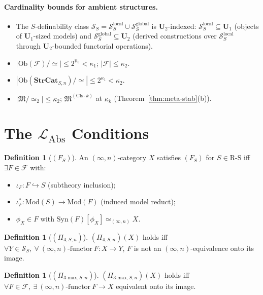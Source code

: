 \documentclass[11pt]{article}
\theoremstyle{plain}
\theoremstyle{definition}
\newtheorem{definition}[theorem]{Definition}
\newcommand{\RS}{\mathrm{R\text{-}S}}
\newcommand{\cS}{\mathcal{S}}
\newcommand{\cF}{\mathcal{F}}
\newcommand{\fM}{\mathfrak{M}}
\newcommand{\LAbs}{\mathcal{L}_{\mathrm{Abs}}}
\newcommand{\Ob}{\mathrm{Ob}}
\newcommand{\Syn}{\mathrm{Syn}}
\newcommand{\Mod}{\mathrm{Mod}}
\begin{document}
\paragraph{Cardinality bounds for ambient structures.}
\begin{itemize}
\item The $S$-definability class $\cS_S = \cS_S^{\mathrm{local}} \cup \cS_S^{\mathrm{global}}$ is $\mathbf{U}_2$-indexed: $\cS_S^{\mathrm{local}} \subseteq \mathbf{U}_1$ (objects of $\mathbf{U}_1$-sized models) and $\cS_S^{\mathrm{global}} \subseteq \mathbf{U}_2$ (derived constructions over $\cS_S^{\mathrm{local}}$ through $\mathbf{U}_2$-bounded functorial operations).
\item $|\Ob(\cF)/\!\simeq| \leq 2^{\aleph_0} < \kappa_1$; $|\cF| \leq \kappa_2$.
\item $|\Ob(\mathbf{StrCat}_{S, n})/\!\simeq| \leq 2^{\kappa_1} < \kappa_2$.
\item $|\fM / \!\simeq_2| \leq \kappa_2$; $\fM^{(\mathrm{Cls}\cdot k)}$ at $\kappa_k$ (Theorem~\ref{thm:meta-stab}(b)).
\end{itemize}

\section{\texorpdfstring{The $\LAbs$ Conditions}{The L\_Abs Conditions}}\label{sec:conditions}

\begin{definition}[$(F_S)$]\label{def:F}
An $(\infty, n)$-category $X$ satisfies $(F_S)$ for $S \in \RS$ iff $\exists F \in \cF$ with:
\begin{itemize}
\item[\textbf{(F-1)}] $\iota_F : F \hookrightarrow S$ (subtheory inclusion);
\item[\textbf{(F-2)}] $\iota_F^* : \Mod(S) \to \Mod(F)$ (induced model reduct);
\item[\textbf{(F-3)}] $\phi_X \in F$ with $\Syn(F)[\phi_X] \simeq_{(\infty, n)} X$.
\end{itemize}
\end{definition}

\begin{definition}[$(\Pi_{4, S, n})$]\label{def:pi4}
$(\Pi_{4, S, n})(X)$ holds iff $\forall Y \in \cS_S,\ \forall\ (\infty, n)\text{-functor}\ F : X \to Y$, $F$ is not an $(\infty, n)$-equivalence onto its image.
\end{definition}

\begin{definition}[$(\Pi_{3\text{-max}, S, n})$]\label{def:pi3max}
$(\Pi_{3\text{-max}, S, n})(X)$ holds iff $\forall F \in \cF,\ \exists\ (\infty, n)\text{-functor}\ F \to X$ equivalent onto its image.
\end{definition}
\end{document}
